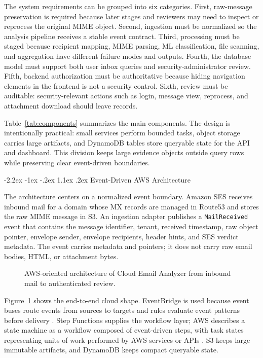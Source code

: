 \documentclass[12pt,a4paper]{article}
\makeatletter
\renewcommand\section{\@startsection {section}{1}{\z@}%
  {-2.2ex \@plus -1ex \@minus -.2ex}%
  {1.1ex \@plus .2ex}%
  {\centering\normalfont\normalsize\bfseries}}
\makeatother
\begin{document}
The system requirements can be grouped into six categories. First, raw-message preservation is required because later stages and reviewers may need to inspect or reprocess the original MIME object. Second, ingestion must be normalized so the analysis pipeline receives a stable event contract. Third, processing must be staged because recipient mapping, MIME parsing, ML classification, file scanning, and aggregation have different failure modes and outputs. Fourth, the database model must support both user inbox queries and security-administrator review. Fifth, backend authorization must be authoritative because hiding navigation elements in the frontend is not a security control. Sixth, review must be auditable: security-relevant actions such as login, message view, reprocess, and attachment download should leave records.



Table~\ref{tab:components} summarizes the main components. The design is intentionally practical: small services perform bounded tasks, object storage carries large artifacts, and DynamoDB tables store queryable state for the API and dashboard. This division keeps large evidence objects outside query rows while preserving clear event-driven boundaries.

\section{Event-Driven AWS Architecture}

The architecture centers on a normalized event boundary. Amazon SES receives inbound mail for a domain whose MX records are managed in Route53 and stores the raw MIME message in S3. An ingestion adapter publishes a \texttt{MailReceived} event that contains the message identifier, tenant, received timestamp, raw object pointer, envelope sender, envelope recipients, header hints, and SES verdict metadata. The event carries metadata and pointers; it does not carry raw email bodies, HTML, or attachment bytes.

\begin{figure}[!htbp]
\centering
\resizebox{\textwidth}{!}{}
\caption{AWS-oriented architecture of Cloud Email Analyzer from inbound mail to authenticated review.}
\label{fig:architecture}
\end{figure}

Figure~\ref{fig:architecture} shows the end-to-end cloud shape. EventBridge is used because event buses route events from sources to targets and rules evaluate event patterns before delivery \cite{aws_eventbridge_bus}. Step Functions supplies the workflow layer; AWS describes a state machine as a workflow composed of event-driven steps, with task states representing units of work performed by AWS services or APIs \cite{aws_step_functions}. S3 keeps large immutable artifacts, and DynamoDB keeps compact queryable state.
\end{document}
